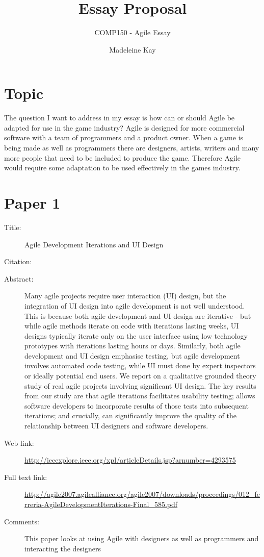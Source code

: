 \documentclass{scrartcl}
\title{Essay Proposal}
\subtitle{COMP150 - Agile Essay}
\author{Madeleine Kay}
\begin{document}
\maketitle

\section*{Topic}
The question I want to address in my essay is how can or should Agile be adapted for use in the game industry? Agile is designed for more commercial software with a team of programmers and a product owner. When a game is being made as well as programmers there are designers, artists, writers and many more people that need to be included to produce the game. Therefore Agile would require some adaptation to be used effectively in the games industry. 


\section*{Paper 1}
\begin{description}
	\item[Title:] 
	Agile Development Iterations and UI Design	
	\item[Citation:] \cite{Ferreira}
	\item[Abstract:] Many agile projects require user interaction (UI) design, but the integration of UI design into agile development is not well understood. This is because both agile development and UI design are iterative - but while agile methods iterate on code with iterations lasting weeks, UI designs typically iterate only on the user interface using low technology prototypes with iterations lasting hours or days. Similarly, both agile development and UI design emphasise testing, but agile development involves automated code testing, while UI must done by expert inspectors or ideally potential end users. We report on a qualitative grounded theory study of real agile projects involving significant UI design. The key results from our study are that agile iterations facilitates usability testing; allows software developers to incorporate results of those tests into subsequent iterations; and crucially, can significantly improve the quality of the relationship between UI designers and software developers.
	\item[Web link:] \url{http://ieeexplore.ieee.org/xpl/articleDetails.jsp?arnumber=4293575}
	\item[Full text link:] \url{http://agile2007.agilealliance.org/agile2007/downloads/proceedings/012_ferreria-AgileDevelopmentIterations-Final_585.pdf}
	\item[Comments:]  This paper looks at using Agile with designers as well as programmers and interacting the designers 
\end{description}
\end{document}
